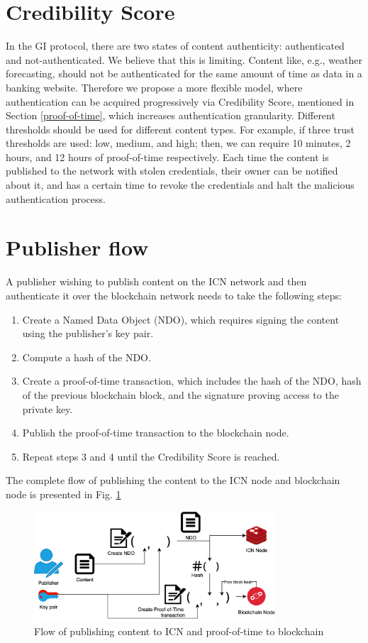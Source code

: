 \section{Credibility Score}
\label{credibility-score}
In the GI protocol, there are two states of content authenticity: authenticated and not-authenticated. We believe that this is limiting. Content like, e.g., weather forecasting, should not be authenticated for the same amount of time as data in a banking website. Therefore we propose a more flexible model, where authentication can be acquired progressively via Credibility Score, mentioned in Section \ref{proof-of-time}, which increases authentication granularity. Different thresholds should be used for different content types. For example, if three trust thresholds are used: low, medium, and high; then, we can require 10 minutes, 2 hours, and 12 hours of proof-of-time respectively. Each time the content is published to the network with stolen credentials, their owner can be notified about it, and has a certain time to revoke the credentials and halt the malicious authentication process.

\section{Publisher flow}
A publisher wishing to publish content on the ICN network and then authenticate it over the blockchain network needs to take the following steps:
\begin{enumerate}
    \item Create a Named Data Object (NDO), which requires signing the content using the publisher's key pair.
    \item Compute a hash of the NDO.
    \item Create a proof-of-time transaction, which includes the hash of the NDO, hash of the previous blockchain block, and the signature proving access to the private key.
    \item Publish the proof-of-time transaction to the blockchain node.
    \item Repeat steps 3 and 4 until the Credibility Score is reached.
\end{enumerate}
The complete flow of publishing the content to the ICN node and blockchain node is presented in Fig. \ref{fig:distribution-flow}
\begin{figure}[h!]
\includegraphics[width=9cm]{img/distribution-flow.png}
\centering
\caption{Flow of publishing content to ICN and proof-of-time to blockchain}
\label{fig:distribution-flow}
\end{figure} 

